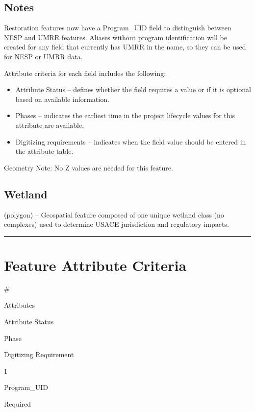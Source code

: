 \documentclass[
  letterpaper,
  DIV=11,
  numbers=noendperiod]{scrreprt}
\providecommand{\tightlist}{%
  \setlength{\itemsep}{0pt}\setlength{\parskip}{0pt}}
\begin{document}
\subsection{Notes}\label{notes-18}

Restoration features now have a Program\_UID field to distinguish
between NESP and UMRR features. Aliases without program identification
will be created for any field that currently has UMRR in the name, so
they can be used for NESP or UMRR data.

Attribute criteria for each field includes the following:

\begin{itemize}
\tightlist
\item
  Attribute Status -- defines whether the field requires a value or if
  it is optional based on available information.
\item
  Phases -- indicates the earliest time in the project lifecycle values
  for this attribute are available.
\item
  Digitizing requirements -- indicates when the field value should be
  entered in the attribute table.
\end{itemize}

Geometry Note: No Z values are needed for this feature.

\subsection{Wetland}\label{wetland-1}

(polygon) -- Geospatial feature composed of one unique wetland class (no
complexes) used to determine USACE jurisdiction and regulatory impacts.

\begin{center}\rule{0.5\linewidth}{0.5pt}\end{center}

\section{Feature Attribute
Criteria}\label{feature-attribute-criteria-16}

\#

Attributes

Attribute Status

Phase

Digitizing Requirement

1

Program\_UID

Required
\end{document}
